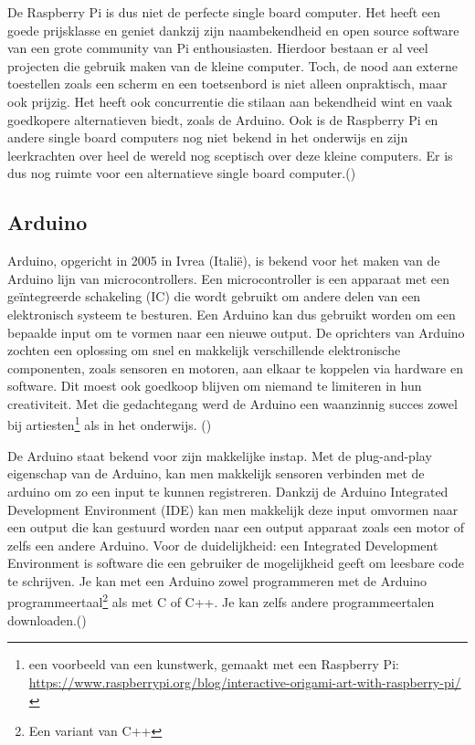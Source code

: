 De Raspberry Pi is dus niet de perfecte single board computer. Het heeft een goede prijsklasse en geniet dankzij zijn naambekendheid en open source software van een grote community van Pi enthousiasten. Hierdoor bestaan er al veel projecten die gebruik maken van de kleine computer. Toch, de nood aan externe toestellen zoals een scherm en een toetsenbord is niet alleen onpraktisch, maar ook prijzig. Het heeft ook concurrentie die stilaan aan bekendheid wint en vaak goedkopere alternatieven biedt, zoals de Arduino. Ook is de Raspberry Pi en andere single board computers nog niet bekend in het onderwijs en zijn leerkrachten over heel de wereld nog sceptisch over deze kleine computers. Er is dus nog ruimte voor een alternatieve single board computer.(\cite{Susan2014})

\subsection{Arduino}

Arduino, opgericht in 2005 in Ivrea (Italië), is bekend voor het maken van de Arduino lijn van microcontrollers. Een microcontroller is een apparaat met een geïntegreerde schakeling (IC) die wordt gebruikt om andere delen van een elektronisch systeem te besturen. Een Arduino kan dus gebruikt worden om een bepaalde input om te vormen naar een nieuwe output. De oprichters van Arduino zochten een oplossing om snel en makkelijk verschillende elektronische componenten, zoals sensoren en motoren, aan elkaar te koppelen via hardware en software. Dit moest ook goedkoop blijven om niemand te limiteren in hun creativiteit. Met die gedachtegang werd de Arduino een waanzinnig succes zowel bij artiesten\footnote{een voorbeeld van een kunstwerk, gemaakt met een Raspberry Pi: \url{https://www.raspberrypi.org/blog/interactive-origami-art-with-raspberry-pi/}} als in het onderwijs. (\cite{Hughes})

De Arduino staat bekend voor zijn makkelijke instap. Met de plug-and-play eigenschap van de Arduino, kan men makkelijk sensoren verbinden met de arduino om zo een input te kunnen registreren. Dankzij de Arduino Integrated Development Environment (IDE) kan men makkelijk deze input omvormen naar een output die kan gestuurd worden naar een output apparaat zoals een motor of zelfs een andere Arduino. Voor de duidelijkheid: een Integrated Development Environment is software die een gebruiker de mogelijkheid geeft om leesbare code te schrijven. Je kan met een Arduino zowel programmeren met de Arduino programmeertaal\footnote{Een variant van C++} als met C of C++. Je kan zelfs andere programmeertalen downloaden.(\cite{Teja2021})

